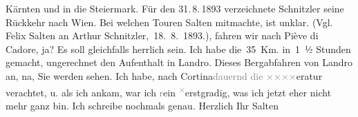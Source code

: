\begin{ledgroupsized}[t]{13cm}
{{{                     Kärnten und in die Steiermark. Für den 31. 8. 1893 verzeichnete Schnitzler seine Rückkehr nach Wien. Bei welchen Touren Salten
                  mitmachte, ist unklar. (Vgl. Felix Salten an Arthur Schnitzler, 18. 8. 1893.)}}}\label{K_L03127-1h}, fahren wir nach Piève di Cadore,
               ja? Es soll gleichfalls herrlich sein. Ich habe die 35 Km. in 1 ½ Stunden gemacht,
               ungerechnet den Aufenthalt in Landro. Dieses
               Bergabfahren von Landro an, na, Sie werden sehen.
               Ich habe, nach Cortina\textcolor{gray}{dauernd die}{ }\textcolor{gray}{×}\-\textcolor{gray}{×}\-\textcolor{gray}{×}\-\textcolor{gray}{×}eratur verachtet, u. als ich ankam, war ich
                  \textcolor{gray}{r}ein \substVorne{}\textsuperscript{\textcolor{gray}{×}}\substDazwischen{}e\substHinten{}rstgradig, was ich jetzt eher nicht
               mehr ganz bin. Ich schreibe nochmals genau. 
            \pend
           \pstart Herzlich Ihr \spacefill\mbox{Salten}\pend{}
         
         \endnumbering{}\end{ledgroupsized}  \newcommand{\dateiname}{L03127}\newcommand{\titel}{Felix Salten an Arthur Schnitzler, 14. 8. 1893}\newcommand{\editorInnen}{Martin Anton Müller und Laura Untner}
      